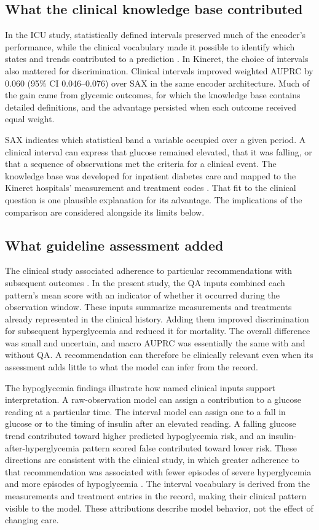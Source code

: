 \subsection{What the clinical knowledge base contributed}
In the ICU study, statistically defined intervals preserved much of the encoder's performance, while the clinical vocabulary made it possible to identify which states and trends contributed to a prediction \citep{oded2026intervene}. In Kineret, the choice of intervals also mattered for discrimination. Clinical intervals improved weighted AUPRC by 0.060 (95\% CI 0.046--0.076) over SAX in the same encoder architecture. Much of the gain came from glycemic outcomes, for which the knowledge base contains detailed definitions, and the advantage persisted when each outcome received equal weight.

SAX indicates which statistical band a variable occupied over a given period. A clinical interval can express that glucose remained elevated, that it was falling, or that a sequence of observations met the criteria for a clinical event. The knowledge base was developed for inpatient diabetes care and mapped to the Kineret hospitals' measurement and treatment codes \citep{oded2027kineret-jbi}. That fit to the clinical question is one plausible explanation for its advantage. The implications of the comparison are considered alongside its limits below.

\subsection{What guideline assessment added}
The clinical study associated adherence to particular recommendations with subsequent outcomes \citep{oded2027kineret-jbi}. In the present study, the QA inputs combined each pattern's mean score with an indicator of whether it occurred during the observation window. These inputs summarize measurements and treatments already represented in the clinical history. Adding them improved discrimination for subsequent hyperglycemia and reduced it for mortality. The overall difference was small and uncertain, and macro AUPRC was essentially the same with and without QA. A recommendation can therefore be clinically relevant even when its assessment adds little to what the model can infer from the record.

The hypoglycemia findings illustrate how named clinical inputs support interpretation. A raw-observation model can assign a contribution to a glucose reading at a particular time. The interval model can assign one to a fall in glucose or to the timing of insulin after an elevated reading. A falling glucose trend contributed toward higher predicted hypoglycemia risk, and an insulin-after-hyperglycemia pattern scored false contributed toward lower risk. These directions are consistent with the clinical study, in which greater adherence to that recommendation was associated with fewer episodes of severe hyperglycemia and more episodes of hypoglycemia \citep{oded2027kineret-jbi}. The interval vocabulary is derived from the measurements and treatment entries in the record, making their clinical pattern visible to the model. These attributions describe model behavior, not the effect of changing care.

